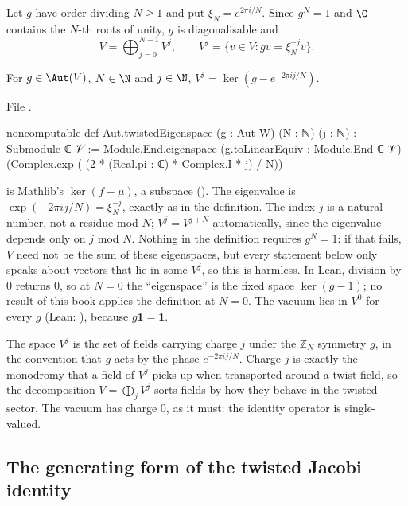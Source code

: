 Let $g$ have order dividing $N\ge1$ and put $\xi_N=e^{2\pi i/N}$.  Since $g^N=1$ and $\C$ contains
the $N$-th roots of unity, $g$ is diagonalisable and
\begin{equation*}
  V=\bigoplus_{j=0}^{N-1}V^j,\qquad V^j=\{v\in V : gv=\xi_N^{-j}v\}.
\end{equation*}
\begin{definition}\label{ch06:def:eigen}
For $g\in\Aut(V)$, $N\in\N$ and $j\in\N$, $V^j=\ker(g-e^{-2\pi i j/N})$.
\end{definition}
\noindent File .
\begin{leancode}
noncomputable def Aut.twistedEigenspace (g : Aut W) (N : ℕ) (j : ℕ) : Submodule ℂ 𝒱 :=
  Module.End.eigenspace (g.toLinearEquiv : Module.End ℂ 𝒱)
    (Complex.exp (-(2 * (Real.pi : ℂ) * Complex.I * j) / N))
\end{leancode}
\begin{dictionary}
 is Mathlib's $\ker(f-\mu)$, a subspace ().
The eigenvalue is $\exp(-2\pi i j/N)=\xi_N^{-j}$, exactly as in the definition.  The index $j$ is a
natural number, not a residue mod $N$; $V^j=V^{j+N}$ automatically, since the eigenvalue depends
only on $j$ mod $N$.  Nothing in the definition requires $g^N=1$: if that fails, $V$ need not be the
sum of these eigenspaces, but every statement below only speaks about vectors that lie in some
$V^j$, so this is harmless.  In Lean, division by $0$ returns $0$, so at $N=0$ the ``eigenspace'' is
the fixed space $\ker(g-1)$; no result of this book applies the definition at $N=0$.  The vacuum lies
in $V^0$ for every $g$ (Lean: ), because $g\mathbf
1=\mathbf 1$.
\end{dictionary}

\begin{physics}
The space $V^j$ is the set of fields carrying charge $j$ under the $\mathbb Z_N$ symmetry $g$, in the convention that $g$ acts by the phase $e^{-2\pi i j/N}$. Charge $j$ is exactly the monodromy that a field of $V^j$ picks up when transported around a twist field, so the decomposition $V=\bigoplus_jV^j$ sorts fields by how they behave in the twisted sector. The vacuum has charge $0$, as it must: the identity operator is single-valued.
\end{physics}

\subsection{The generating form of the twisted Jacobi identity}

